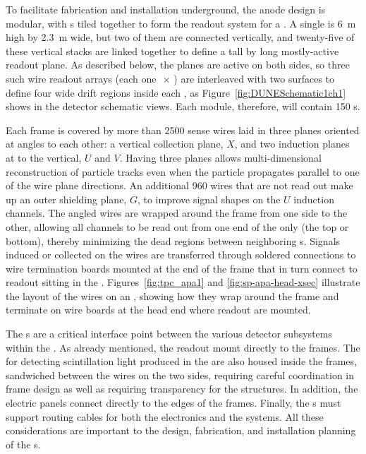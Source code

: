 To facilitate fabrication and installation underground, the anode design is modular, with s tiled together to form the readout system for a \nominalmodsize {}. A single  is \SI{6}{m} high by \SI{2.3}{m} wide, but two of them are connected vertically, and twenty-five of these vertical stacks are linked together to define a \tpcheight %
tall by \sptpclen %
long mostly-active readout plane.  As described below, the planes are active on both sides, so three such wire readout arrays (each one \tpcheight$\,\times\,$\sptpclen) %
are interleaved with two  surfaces to define four \spmaxdrift %
wide drift regions inside each , as Figure~\ref{fig:DUNESchematic1ch1} shows in the detector schematic views. Each  \nominalmodsize module, therefore, will contain 150 s.

Each  frame is covered by more than \num{2500} sense wires laid in three planes  oriented at angles to each other: a vertical collection plane, $X$, and two induction planes at \apainducwireangle to the vertical, $U$ and $V$. Having three planes allows multi-dimensional reconstruction of particle tracks even when the particle propagates parallel to one of the wire plane directions.  An additional \num{960} wires that are not read out make up an outer shielding plane, $G$, to improve signal shapes on the $U$ induction channels.  The angled wires are wrapped around the frame from one side to the other, allowing all channels to be read out from one end of the  only (the top or bottom), thereby minimizing the dead regions between neighboring s. Signals induced or collected on the wires are transferred through soldered connections to wire termination boards mounted at the end of the  frame that in turn connect to  readout  sitting in the .  Figures~\ref{fig:tpc_apa1} and \ref{fig:sp-apa-head-xsec} illustrate the layout of the wires on an , showing how they wrap around the frame and terminate on wire boards at the head end where readout  are mounted.

The s are a critical interface point between the various detector subsystems within the .  As already mentioned, the  readout  mount directly to the  frames.  The  for detecting scintillation light produced in the  are also housed inside the frames, sandwiched between the wires on the two sides, requiring careful coordination in frame design as well as requiring transparency for the  structures.  In addition, the electric  panels connect directly to the edges of the  frames.  Finally, the s must support routing cables for both the  electronics and the  systems. All these considerations are important to the design, fabrication, and installation planning of the s.

